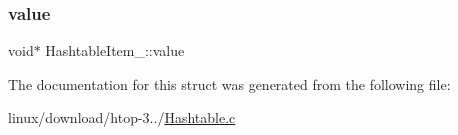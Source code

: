 \subsubsection{\texorpdfstring{value}{value}}
{\footnotesize\ttfamily void$\ast$ Hashtable\+Item\+\_\+\+::value}



The documentation for this struct was generated from the following file\+:\begin{DoxyCompactItemize}
\item 
linux/download/htop-\/3../\hyperlink{Hashtable_8c}{Hashtable.\+c}\end{DoxyCompactItemize}
